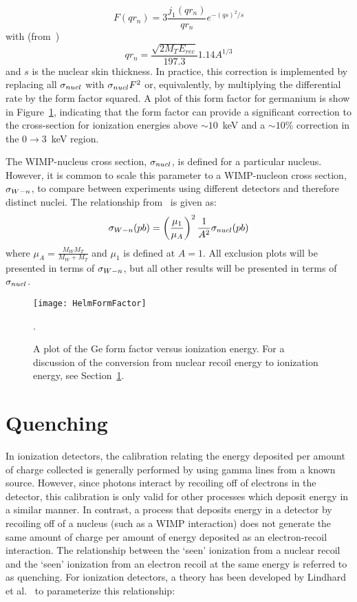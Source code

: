 		\begin{equation}
			F (q r_{n}) = 3 \frac{j_{1}(q r_{n})}{q r_{n}} e^{-(q s)^{2}/s}
			\label{eqn:WSHelmFF}
		\end{equation}
with (from~\cite{Lew96})
		\[
			q r_{n} = \frac{\sqrt{2  M_{T} E_{rec}}}{197.3} 1.14 A^{1/3}
		\]
and $s$ is the nuclear skin thickness.  In practice, this correction is implemented by replacing all $\sigma_{nucl}$ with $\sigma_{nucl} F^{2}$ or, equivalently, by multiplying the differential rate by the form factor squared.  A plot of this form factor for germanium is show in Figure~\ref{fig:HelmFF}, indicating that the form factor can provide a significant correction to the cross-section for ionization energies above $\sim10$~keV and a $\sim10$\% correction in the 0$\to$3~keV region.  

The WIMP-nucleus cross section, $\sigma_{nucl}$, is defined for a particular nucleus.  However, it is common to scale this parameter to a WIMP-nucleon cross section, $\sigma_{W-n}$, to compare between experiments using different detectors and therefore distinct nuclei.  The relationship from~\cite{Alner2005444} is given as: 
		\begin{equation}
			\sigma_{W-n} (pb) = \left( \frac{\mu_{1}}{\mu_{A}} \right)^{2}\frac{1}{A^{2}} \sigma_{nucl} (pb)
			\label{eqn:SigmaConversion}
		\end{equation}
where $\mu_{A} = \frac{M_{W} M_{T}}{M_{W} + M_{T}}$ and $\mu_{1}$ is defined at $A=1$.  All exclusion plots will be presented in terms of $\sigma_{W-n}$, but all other results will be presented in terms of $\sigma_{nucl}$.

		\begin{figure}
			\centering
			\texttt{[image: HelmFormFactor]}
			\caption[A plot of the Ge form factor versus ionization energy]
			{A plot of the Ge form factor versus ionization energy.  For a discussion of the 
			conversion from nuclear recoil energy to ionization energy, see 
			Section~\ref{sec:ResultsQuenching}.}
			\label{fig:HelmFF}.
		\end{figure}
	\section{Quenching}
	\label{sec:ResultsQuenching}
In ionization detectors, the calibration relating the energy deposited per amount of charge collected is generally performed by using gamma lines from a known source.  However, since photons interact by recoiling off of electrons in the detector, this calibration is only valid for other processes which deposit energy in a similar manner.  In contrast, a process that deposits energy in a detector by recoiling off of a nucleus (such as a WIMP interaction) does not generate the same amount of charge per amount of energy deposited as an electron-recoil interaction.  The relationship between the `seen' ionization from a nuclear recoil and the `seen' ionization from an electron recoil at the same energy is referred to as quenching.  For ionization detectors, a theory has been developed by Lindhard et al.~\cite{Lindhard:1961fa} to parameterize this relationship:

